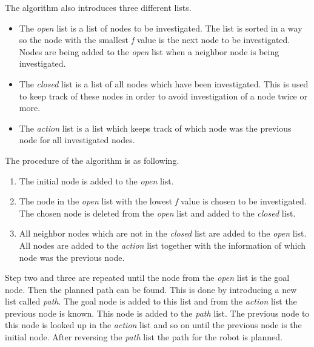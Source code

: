 The algorithm also introduces three different lists.

\begin{itemize}
	\item The \emph{open} list is a list of nodes to be investigated. The list is sorted in a way so the node with the smallest \emph{f} value is the next node to be investigated. Nodes are being added to the \emph{open} list when a neighbor node is being investigated.

	\item The \emph{closed} list is a list of all nodes which have been investigated. This is used to keep track of these nodes in order to avoid investigation of a node twice or more.

	\item The \emph{action} list is a list which keeps track of which node was the previous node for all investigated nodes.\\
\end{itemize}

The procedure of the algorithm is as following. 

\begin{enumerate}
  \item The initial node is added to the \emph{open} list.

  \item The node in the \emph{open} list with the lowest \emph{f} value is chosen to be investigated. The chosen node is deleted from the \emph{open} list and added to the \emph{closed} list. 

  \item All neighbor nodes which are not in the \emph{closed} list are added to the \emph{open} list. All nodes are added to the \emph{action} list together with the information of which node was the previous node.
\end{enumerate}

Step two and three are repeated until the node from the \emph{open} list is the goal node. Then the planned path can be found. This is done by introducing a new list called \emph{path}. The goal node is added to this list and from the \emph{action} list the previous node is known. This node is added to the \emph{path} list. The previous node to this node is looked up in the \emph{action} list and so on until the previous node is the initial node. After reversing the \emph{path} list the path for the robot is planned. \\


